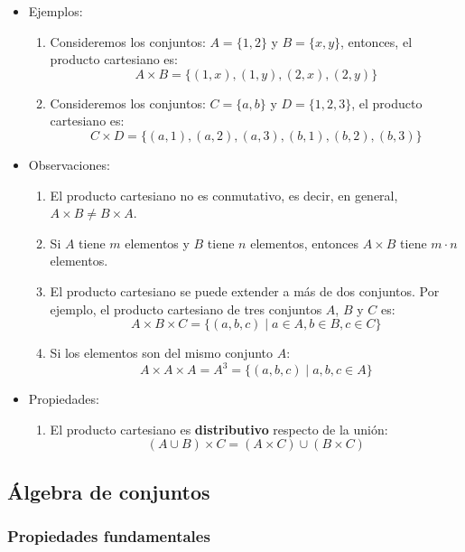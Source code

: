 \begin{itemize}
	\item Ejemplos:
	
	\begin{enumerate}
		\item Consideremos los conjuntos: \(A = \{1, 2\}\) y \(B = \{x, y\}\), entonces, el producto cartesiano es:
		$$A \times B = \{(1, x), (1, y), (2, x), (2, y)\}$$
		
		\item Consideremos los conjuntos: \(C = \{a, b\}\) y \(D = \{1, 2, 3\}\), el producto cartesiano es:
		$$C \times D = \{(a, 1), (a, 2), (a, 3), (b, 1), (b, 2), (b, 3)\}$$
	\end{enumerate}
	
	\item Observaciones:
	
	\begin{enumerate}
		\item El producto cartesiano no es conmutativo, es decir, en general, \(A \times B \neq B \times A\).
		\item Si \(A\) tiene \(m\) elementos y \(B\) tiene \(n\) elementos, entonces \(A \times B\) tiene \(m \cdot n\) elementos.
		\item El producto cartesiano se puede extender a más de dos conjuntos. Por ejemplo, el producto cartesiano de tres conjuntos \(A\), \(B\) y \(C\) es:
		$$A \times B \times C = \{(a, b, c) \mid a \in A, b \in B, c \in C\}$$
		\item Si los elementos son del mismo conjunto $A$:
		\[ A \times A \times A = A^3 = \{(a, b, c) \mid a, b, c \in A\} \]
	\end{enumerate}
	
	\item Propiedades:
	\begin{enumerate}[label=\roman*)]
		\item El producto cartesiano es \textbf{distributivo} respecto de la unión:
		\[ \left( A \cup B \right) \times C = \left( A \times C \right) \cup \left( B \times C \right) \]
	\end{enumerate}
	
\end{itemize}


\subsection{Álgebra de conjuntos} \label{sec:algebra_conjuntos}

\subsubsection{Propiedades fundamentales}

